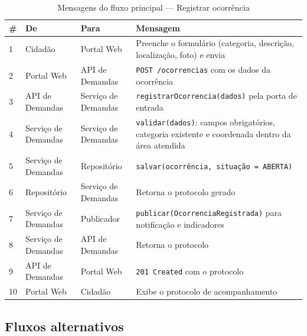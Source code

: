 \documentclass[12pt,a4paper,oneside]{article}
\newcommand{\fonte}[1]{\par\vspace{5pt}{\footnotesize\singlespacing Fonte: #1\par}}
\newcommand{\cab}[1]{\textbf{\footnotesize #1}}
\begin{document}
\begin{table}[H]
\centering
\caption{Mensagens do fluxo principal — Registrar ocorrência}
\label{tab:fluxo}
{\small\singlespacing
\begin{tabularx}{\textwidth}{C{0.9cm} L{3.0cm} L{3.0cm} X}
\toprule
\cab{\#} & \cab{De} & \cab{Para} & \cab{Mensagem} \\
 & Cidadão & Portal Web & Preenche o formulário (categoria, descrição,
localização, foto) e envia \\
2 & Portal Web & API de Demandas & \texttt{POST /ocorrencias} com os dados da
ocorrência \\
3 & API de Demandas & Serviço de Demandas & \texttt{registrarOcorrencia(dados)}
pela porta de entrada \\
4 & Serviço de Demandas & Serviço de Demandas & \texttt{validar(dados)}:
campos obrigatórios, categoria existente e coordenada dentro da área atendida \\
5 & Serviço de Demandas & Repositório & \texttt{salvar(ocorrência, situação =
ABERTA)} \\
6 & Repositório & Serviço de Demandas & Retorna o protocolo gerado \\
7 & Serviço de Demandas & Publicador & \texttt{publicar(OcorrenciaRegistrada)}
para notificação e indicadores \\
8 & Serviço de Demandas & API de Demandas & Retorna o protocolo \\
9 & API de Demandas & Portal Web & \texttt{201 Created} com o protocolo \\
10 & Portal Web & Cidadão & Exibe o protocolo de acompanhamento \\
\bottomrule
\end{tabularx}}
\fonte{elaborado pelos autores (2026).}
\end{table}

\subsection{Fluxos alternativos}
\end{document}
